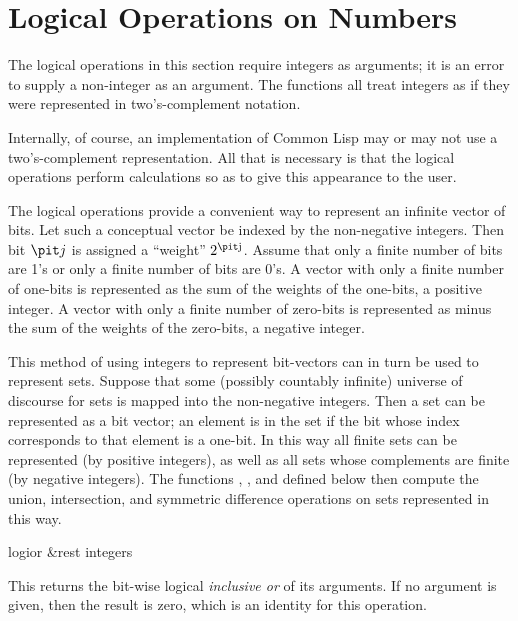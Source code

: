 \section{Logical Operations on Numbers}

The logical operations in this section require integers
as arguments; it is an error to supply a non-integer as an argument.
The functions all treat integers as if
they were represented in two's-complement notation.

\beforenoterule
\begin{implementation}
Internally, of course, an implementation of
Common Lisp may or may not use a two's-complement representation.
All that is necessary is that the logical operations
perform calculations so as to give this appearance to the user.
\end{implementation}
\afternoterule

The logical operations provide a convenient way to represent
an infinite vector of bits.  Let such a conceptual vector be
indexed by the non-negative integers.  Then bit ${\it j}$ is assigned
a ``weight'' $2^{\hbox{\scriptsize\it j}}$.
Assume that only a finite number of bits are 1's
or only a finite number of bits are 0's.
A vector with only a finite number of one-bits is represented
as the sum of the weights of the one-bits, a positive integer.
A vector with only a finite number of zero-bits is represented
as  minus the sum of the weights of the zero-bits, a negative integer.

This method of using integers to represent bit-vectors can in turn
be used to represent sets.  Suppose that some (possibly countably
infinite) universe of discourse
for sets is mapped into the non-negative integers.
Then a set can be represented as a bit vector; an element is in the
set if the bit whose index corresponds to that element is a one-bit.
In this way all finite sets can be represented (by positive
integers), as well as all sets whose complements are finite
(by negative integers).  The functions , ,
and  defined below then compute the union,
intersection, and symmetric difference operations on sets
represented in this way.

\begin{defun}[Function]
logior &rest integers

This returns the bit-wise logical {\it inclusive or} of its arguments.
If no argument is given, then the result is zero,
which is an identity for this operation.
\end{defun}

